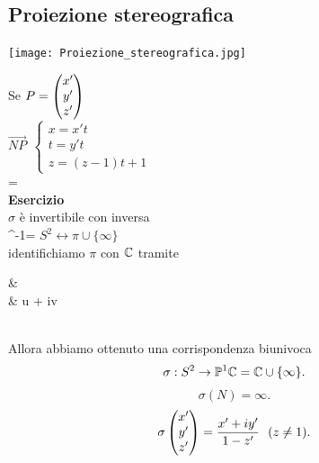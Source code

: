 \documentclass[12px]{article}
\begin{document}
	\subsection{Proiezione stereografica}
	\begin{center}
	\texttt{[image: Proiezione\_stereografica.jpg]}\\
	\end{center}
	Se $P = \begin{pmatrix}x'\\y'\\z'\end{pmatrix}$\\
	 $\overrightarrow{NP}\ \ \begin{cases}
	 	x = x't\\
		t = y't\\
		z = (z-1)t + 1
	 \end{cases}$\\
	 \sigma {} = \\
	 \textbf{Esercizio}\\
	 $\sigma$ è invertibile con inversa\\
	 \sigma^-1=
	 $S^2 \leftrightarrow \pi\cup \{\infty\}$\\
	 identifichiamo  $\pi$ con $\mathbb{C}$ tramite\\
	 \begin{aligend}
		&\pi \ \ \ \ \rightarrow\ \ \ \ \ \C\\
		& \rightarrow u + iv
	 \end{aligend}\\
	 Allora abbiamo ottenuto una corrispondenza biunivoca 
	 \[
		 \sigma : S^2 \rightarrow \mathbb{P}^1{\mathbb{C}} = \mathbb{C}\cup\{\infty\}
	 .\] 
	 \[
	 \sigma(N) =\infty
	 .\] 
	 \[
	 \sigma\begin{pmatrix}x'\\y'\\z'\end{pmatrix} = \frac{x'+iy' }{1-z'} \ \ (z\neq 1)
	 .\] 
	 \newpage
\end{document}
